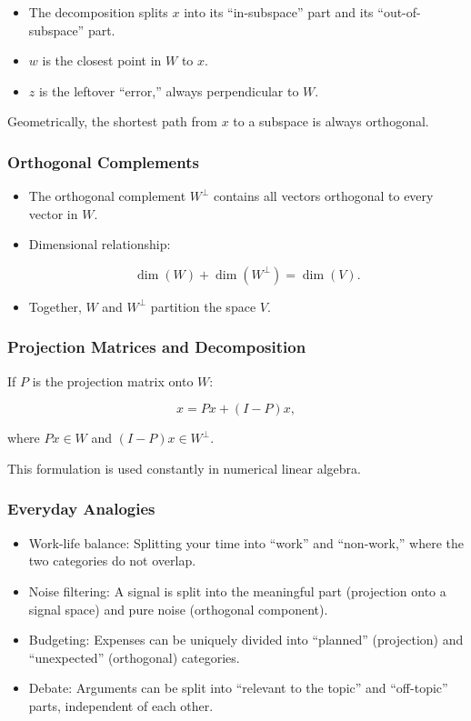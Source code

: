\documentclass[
  letterpaper,
  DIV=11,
  numbers=noendperiod]{scrreprt}
\providecommand{\tightlist}{%
  \setlength{\itemsep}{0pt}\setlength{\parskip}{0pt}}
\begin{document}
\begin{itemize}
\tightlist
\item
  The decomposition splits \(x\) into its ``in-subspace'' part and its
  ``out-of-subspace'' part.
\item
  \(w\) is the closest point in \(W\) to \(x\).
\item
  \(z\) is the leftover ``error,'' always perpendicular to \(W\).
\end{itemize}

Geometrically, the shortest path from \(x\) to a subspace is always
orthogonal.

\subsubsection{Orthogonal Complements}\label{orthogonal-complements}

\begin{itemize}
\item
  The orthogonal complement \(W^\perp\) contains all vectors orthogonal
  to every vector in \(W\).
\item
  Dimensional relationship:

  \[
  \dim(W) + \dim(W^\perp) = \dim(V).
  \]
\item
  Together, \(W\) and \(W^\perp\) partition the space \(V\).
\end{itemize}

\subsubsection{Projection Matrices and
Decomposition}\label{projection-matrices-and-decomposition}

If \(P\) is the projection matrix onto \(W\):

\[
x = Px + (I-P)x,
\]

where \(Px \in W\) and \((I-P)x \in W^\perp\).

This formulation is used constantly in numerical linear algebra.

\subsubsection{Everyday Analogies}\label{everyday-analogies-71}

\begin{itemize}
\tightlist
\item
  Work-life balance: Splitting your time into ``work'' and ``non-work,''
  where the two categories do not overlap.
\item
  Noise filtering: A signal is split into the meaningful part
  (projection onto a signal space) and pure noise (orthogonal
  component).
\item
  Budgeting: Expenses can be uniquely divided into ``planned''
  (projection) and ``unexpected'' (orthogonal) categories.
\item
  Debate: Arguments can be split into ``relevant to the topic'' and
  ``off-topic'' parts, independent of each other.
\end{itemize}
\end{document}
